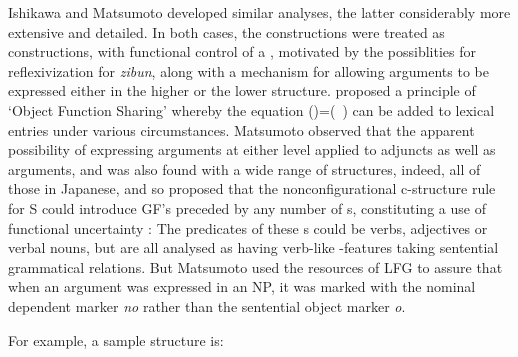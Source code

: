 \documentclass[output=paper,hidelinks]{langscibook}
\begin{document}
Ishikawa and Matsumoto developed similar analyses, the latter considerably more
extensive and detailed.  In both cases, the constructions were treated as {\XCOMP} constructions, with
functional control of a {\SUBJ}, motivated by the possiblities for reflexivization
for \emph{zibun}, along with a mechanism for allowing arguments to be expressed either
in the higher or the lower structure.  \citet[99--100]{Ishikawa1985} proposed a principle
of `Object Function Sharing' whereby the equation \mbox{(\UP\OBJ)=(\UP\XCOMP~\OBJ)} can
be added to lexical entries under various circumstances.  Matsumoto observed that the
apparent possibility of expressing arguments at either level applied to adjuncts
as well as arguments, and was also found with a wide range of {\XCOMP} structures,
indeed, all of those in Japanese, and so proposed that the nonconfigurational c-structure rule
for S could introduce GF's preceded by any number of {\XCOMP}s,
constituting a use of functional uncertainty \citep[87]{Matsumoto1996}:
\ea\label{japansentps}
\z
The predicates of these {\XCOMP}s could be verbs, adjectives or verbal nouns, but are all
analysed as having verb-like {\PRED}-features taking sentential grammatical relations.
But Matsumoto used the resources of LFG to assure that when an argument was expressed
in an NP, it was marked with the nominal dependent marker \emph{no} rather than
the sentential object marker \emph{o}.

For example, a sample structure is:
\end{document}

